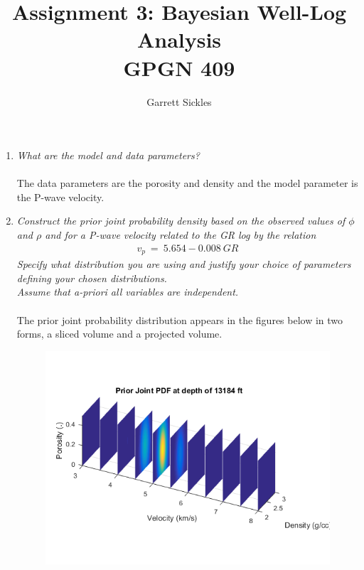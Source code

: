\documentclass[12pt,runningheads]{article}
\begin{document}

\title{Assignment 3: Bayesian Well-Log Analysis\\GPGN 409}
\author{Garrett Sickles}
\maketitle
\pagebreak
\begin{enumerate}
\item \textit{What are the model and data parameters?}\\ \\ 
The data parameters are the porosity and density and the model parameter is the P-wave velocity.
\item \textit{Construct the prior joint probability density based on the observed values of $\phi$ and $\rho$ and for a P-wave velocity related to the GR log by the relation
\begin{align*}
v_{p}\ =\ 5.654 - 0.008\ GR
\end{align*}
Specify what distribution you are using and justify your choice of parameters defining your chosen distributions.\\Assume that a-priori all variables are independent.}\\ \\
The prior joint probability distribution appears in the figures below in two forms, a sliced volume and a projected volume.
\begin{figure}[!h]
\includegraphics[width=\textwidth]{PriorS.png}
\end{figure}

\end{enumerate}
\end{document}
